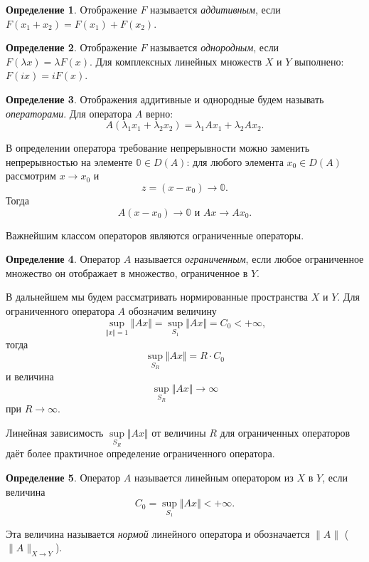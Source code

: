 \documentclass[12pt,a4paper,titlepage,oneside]{book}
\theoremstyle{definition}
\newtheorem*{definition}{Определение}
\theoremstyle{plain}
\theoremstyle{break}
\theoremstyle{remark}
\theoremstyle{remark}
\theoremstyle{remark}
\theoremstyle{remark}
\theoremstyle{plain}
\theoremstyle{plain}
\begin{document}
\begin{definition}
Отображение $F$ называется \textit{аддитивным}, если $F(x_1+x_2)=F(x_1)+F(x_2)$.
\end{definition}

\begin{definition}
Отображение $F$ называется \textit{однородным}, если $F(\lambda x)=\lambda F(x)$. Для комплексных линейных множеств $X$ и $Y$ выполнено: $F(ix)=iF(x)$.
\end{definition}

\begin{definition}
Отображения аддитивные и однородные будем называть \textit{операторами}. Для оператора $A$ верно:
$$A(\lambda_1x_1+\lambda_2x_2)=\lambda_1Ax_1+\lambda_2Ax_2.$$

\end{definition}

В определении оператора требование непрерывности можно заменить непрерывностью на элементе $\mathbb{0} \in D(A)$: для любого элемента $x_0\in D(A)$ рассмотрим $x \to x_0$ и 
$$z=(x-x_0) \to \mathbb{0}.$$
Тогда 
$$A(x-x_0)\to \mathbb{0} \mbox{ и } Ax \to Ax_0.$$

Важнейшим классом операторов являются ограниченные операторы.

\begin{definition} Оператор $A$ называется \textit{ограниченным}, если любое ограниченное множество он отображает в множество, ограниченное в $Y$.
\end{definition}

В дальнейшем мы будем рассматривать нормированные пространства $X$ и $Y$.
Для ограниченного оператора $A$  обозначим величину 
$$\underset{\Vert x\Vert=1}{\sup}\Vert Ax \Vert =\underset{S_1}{\sup}\Vert Ax \Vert =C_0<+\infty,$$
тогда
$$\underset{S_R}{\sup}\Vert Ax \Vert=R\cdot C_0$$
и величина 
$$\underset{S_R}{\sup}\Vert Ax \Vert\to\infty$$
при $R\to\infty$.

Линейная зависимость
$\underset{S_R}{\sup}\Vert Ax \Vert$
от величины $R$ для ограниченных операторов даёт более практичное определение ограниченного оператора.

\begin{definition} Оператор $A$ называется линейным оператором из $X$ в $Y$, если величина 
$$C_0=\underset{S_1}{\sup}\Vert Ax \Vert<+\infty.$$
\end{definition}
Эта величина называется \textit{нормой} линейного оператора и обозначается $\lVert A \rVert$ ($\lVert A \rVert_{X \to Y}$).
\end{document}
